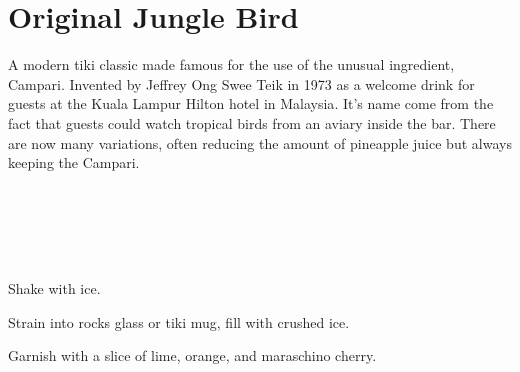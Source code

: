 \section[Jungle Bird]{Original Jungle Bird}

\begin{recipestats}[
	servings=1,
	preptime=5~\minute,
	original=\citefield{originalJungleBird}{title}~\cite{originalJungleBird},
]
\end{recipestats}


\begin{recipeabstract}
	A modern tiki classic made famous for the use of the unusual ingredient, Campari.
	Invented by Jeffrey Ong Swee Teik in 1973 as a welcome drink for guests at the Kuala Lampur Hilton hotel in Malaysia\cite{cocktailSeminars2021}.
	It's name come from the fact that guests could watch tropical birds from an aviary inside the bar.
	There are now many variations, often reducing the amount of pineapple juice but always keeping the Campari.
\end{recipeabstract}


\begin{ingredientcolumns}[1]
	\begin{ingredientblock}
		\\
		\\
		\\
		\\
	\end{ingredientblock}
\end{ingredientcolumns}


\begin{preparation}
\item Shake with ice.
\item Strain into rocks glass or tiki mug, fill with crushed ice.
\item Garnish with a slice of lime, orange, and maraschino cherry.
\end{preparation}


\recipeend%
